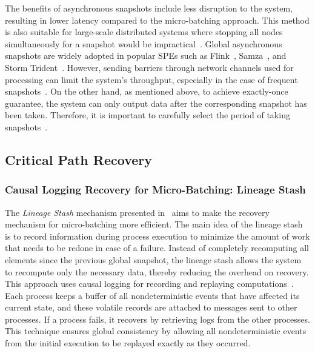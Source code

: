 The benefits of asynchronous snapshots include less disruption to the system, resulting in lower latency compared to the micro-batching approach. This method is also suitable for large-scale distributed systems where stopping all nodes simultaneously for a snapshot would be impractical~\cite{carbone2018scalable}. Global asynchronous snapshots are widely adopted in popular SPEs such as Flink~\cite{carbone2015apache}, Samza~\cite{Noghabi:2017:SSS:3137765.3137770}, and Storm Trident~\cite{apache:storm:trident}. However, sending barriers through network channels used for processing can limit the system's throughput, especially in the case of frequent snapshots~\cite{DBLP:journals/pvldb/BegoliACHKKMS21, trofimov2023bounding}. On the other hand, as mentioned above, to achieve exactly-once guarantee, the system can only output data after the corresponding snapshot has been taken. Therefore, it is important to carefully select the period of taking snapshots~\cite{thepaper}.

\subsection{Critical Path Recovery}
\label{phd-related-critical-path-recovery}

\subsubsection{Causal Logging Recovery for Micro-Batching: Lineage Stash}

The {\em Lineage Stash} mechanism presented in~\cite{Wang:2019:LSF:3341301.3359653} aims to make the recovery mechanism for micro-batching more efficient. The main idea of the lineage stash is to record information during process execution to minimize the amount of work that needs to be redone in case of a failure. Instead of completely recomputing all elements since the previous global snapshot, the lineage stash allows the system to recompute only the necessary data, thereby reducing the overhead on recovery. This approach uses causal logging for recording and replaying computations~\cite{elnozahy1994manetho, alvisi1998message}. Each process keeps a buffer of all nondeterministic events that have affected its current state, and these volatile records are attached to messages sent to other processes. If a process fails, it recovers by retrieving logs from the other processes. This technique ensures global consistency by allowing all nondeterministic events from the initial execution to be replayed exactly as they occurred.


